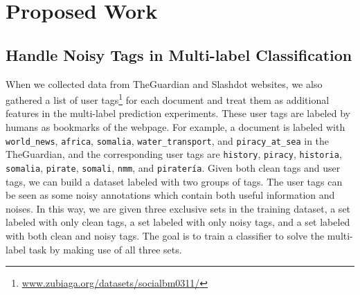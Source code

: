 \section{Proposed Work}


    
\subsection{Handle Noisy Tags in Multi-label Classification}  \label{future_noise}

When we collected data from TheGuardian and Slashdot websites, we also gathered a list of user tags\footnote{\scriptsize\url{www.zubiaga.org/datasets/socialbm0311/}} for each document and treat them as additional features in the multi-label prediction experiments. These user tags are labeled by humans as bookmarks of the webpage. For example, a document is labeled with \texttt{world\_news}, \texttt{africa}, \texttt{somalia}, \texttt{water\_transport}, and \texttt{piracy\_at\_sea} in the TheGuardian, and the corresponding user tags are \texttt{history}, \texttt{piracy}, \texttt{historia}, \texttt{somalia}, \texttt{pirate}, \texttt{somali}, \texttt{nmm}, and \texttt{piratería}. Given both clean tags and user tags, we can build a dataset labeled with two groups of tags. The user tags can be seen as some noisy annotations which contain both useful information and noises. In this way, we are given three exclusive sets in the training dataset, a set labeled with only clean tags, a set labeled with only noisy tags, and a set labeled with both clean and noisy tags. The goal is to train a classifier to solve the multi-label task by making use of all three sets.

